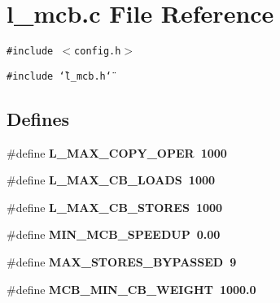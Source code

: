 \section{l\_\-mcb.c File Reference}
\label{l__mcb_8c}
{\tt \#include $<$config.h$>$}\par
{\tt \#include \char`\"{}l\_\-mcb.h\char`\"{}}\par
\subsection*{Defines}
\begin{CompactItemize}
\item 
\#define \bf{L\_\-MAX\_\-COPY\_\-OPER}~1000
\item 
\#define \bf{L\_\-MAX\_\-CB\_\-LOADS}~1000
\item 
\#define \bf{L\_\-MAX\_\-CB\_\-STORES}~1000
\item 
\#define \bf{MIN\_\-MCB\_\-SPEEDUP}~0.00
\item 
\#define \bf{MAX\_\-STORES\_\-BYPASSED}~9
\item 
\#define \bf{MCB\_\-MIN\_\-CB\_\-WEIGHT}~1000.0
\end{CompactItemize}

